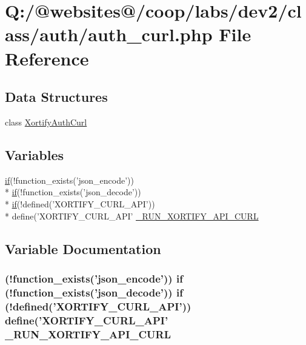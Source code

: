 \hypertarget{auth__curl_8php}{\section{Q\-:/@websites@/coop/labs/dev2/class/auth/auth\-\_\-curl.php File Reference}
\label{auth__curl_8php}
}
\subsection*{Data Structures}
\begin{DoxyCompactItemize}
\item 
class \hyperlink{class_xortify_auth_curl}{Xortify\-Auth\-Curl}
\end{DoxyCompactItemize}
\subsection*{Variables}
\begin{DoxyCompactItemize}
\item 
\hyperlink{index_8php_ae2ccdf355624402b65fc2226f2a661cd}{if}(!function\-\_\-exists('json\-\_\-encode')) \\*
\hyperlink{index_8php_ae2ccdf355624402b65fc2226f2a661cd}{if}(!function\-\_\-exists('json\-\_\-decode')) \\*
\hyperlink{index_8php_ae2ccdf355624402b65fc2226f2a661cd}{if}(!defined('X\-O\-R\-T\-I\-F\-Y\-\_\-\-C\-U\-R\-L\-\_\-\-A\-P\-I')) \\*
define('X\-O\-R\-T\-I\-F\-Y\-\_\-\-C\-U\-R\-L\-\_\-\-A\-P\-I' \hyperlink{auth__curl_8php_acb765b77d87dfa3227ecfd428de40316}{\-\_\-\-R\-U\-N\-\_\-\-X\-O\-R\-T\-I\-F\-Y\-\_\-\-A\-P\-I\-\_\-\-C\-U\-R\-L}
\end{DoxyCompactItemize}


\subsection{Variable Documentation}
\hypertarget{auth__curl_8php_acb765b77d87dfa3227ecfd428de40316}{
\subsubsection[{\-\_\-\-R\-U\-N\-\_\-\-X\-O\-R\-T\-I\-F\-Y\-\_\-\-A\-P\-I\-\_\-\-C\-U\-R\-L}]{ (!function\-\_\-exists('json\-\_\-encode')) {\bf if} (!function\-\_\-exists('json\-\_\-decode')) {\bf if} (!defined('X\-O\-R\-T\-I\-F\-Y\-\_\-\-C\-U\-R\-L\-\_\-\-A\-P\-I')) define('X\-O\-R\-T\-I\-F\-Y\-\_\-\-C\-U\-R\-L\-\_\-\-A\-P\-I' \-\_\-\-R\-U\-N\-\_\-\-X\-O\-R\-T\-I\-F\-Y\-\_\-\-A\-P\-I\-\_\-\-C\-U\-R\-L}}\label{auth__curl_8php_acb765b77d87dfa3227ecfd428de40316}
